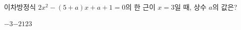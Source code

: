 이차방정식 $2x^2-(5+a)x+a+1=0$의 한 근이 $x=3$일 때, 상수 $a$의 값은?
\begin{choices32}{$-3$}{$-2$}{$1$}{$2$}{$3$}\end{choices32}
